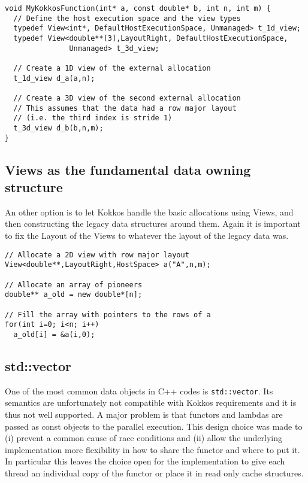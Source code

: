  \begin{lstlisting}
void MyKokkosFunction(int* a, const double* b, int n, int m) {
  // Define the host execution space and the view types
  typedef View<int*, DefaultHostExecutionSpace, Unmanaged> t_1d_view;
  typedef View<double**[3],LayoutRight, DefaultHostExecutionSpace, 
               Unmanaged> t_3d_view;
  
  // Create a 1D view of the external allocation
  t_1d_view d_a(a,n);
 
  // Create a 3D view of the second external allocation
  // This assumes that the data had a row major layout 
  // (i.e. the third index is stride 1)
  t_3d_view d_b(b,n,m);
}
\end{lstlisting}

\subsection{Views as the fundamental data owning structure}

An other option is to let Kokkos handle the basic allocations using Views, 
and then constructing the legacy data structures around them. Again it is
important to fix the Layout of the Views to whatever the layout of the legacy 
data was. 

\begin{lstlisting}
// Allocate a 2D view with row major layout
View<double**,LayoutRight,HostSpace> a("A",n,m);

// Allocate an array of pioneers
double** a_old = new double*[n];

// Fill the array with pointers to the rows of a
for(int i=0; i<n; i++)
  a_old[i] = &a(i,0);
\end{lstlisting}

\subsection{std::vector}

One of the most common data objects in C++ codes is \lstinline|std::vector|. 
Its semantics are unfortunately not compatible with Kokkos requirements 
and it is thus not well supported. A major problem is that functors and lambdas
are passed as const objects to the parallel execution. This design choice was made
to (i) prevent a common cause of race conditions and (ii) allow the underlying 
implementation more flexibility in how to share the functor and where to put it.
In particular this leaves the choice open for the implementation to give each thread 
an individual copy of the functor or place it in read only cache structures.

